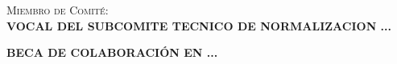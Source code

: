 

\cleardoublepage
\vspace*{10cm}
\textsc{Miembro de Comité}:\\[5pt]
\uppercase{\textbf{VOCAL DEL SUBCOMITE TECNICO DE NORMALIZACION ...}}\\
\cleardoublepage


\cleardoublepage
\vspace*{10cm}
\uppercase{\textbf{Beca de colaboración en ...}}\\
\cleardoublepage

